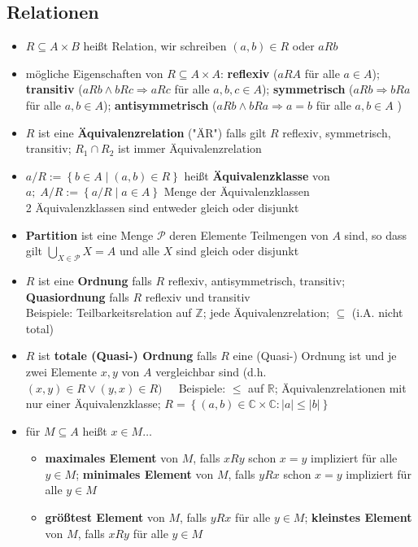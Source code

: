 \documentclass[10pt,a4paper]{article}
\begin{document}
\subsection{Relationen}
\begin{itemize}
\item $R\subseteq A\times B$ heißt Relation, wir schreiben $(a,b) \in R$ oder $aRb$
\item mögliche Eigenschaften von $R\subseteq A\times A$: \textbf{reflexiv} ($aRA$ für alle $a\in A$); \textbf{transitiv} ($aRb\land bRc \Rightarrow aRc$ für alle $a,b,c\in A$); \textbf{symmetrisch} ($aRb\Rightarrow bRa$ für alle $a,b \in A$); \textbf{antisymmetrisch} ($aRb\land bRa \Rightarrow a=b$ für alle $a,b\in A$ )
\item $R$ ist eine \textbf{Äquivalenzrelation} ("ÄR") falls gilt $R$ reflexiv, symmetrisch, transitiv; $R_{1}\cap R_{2}$ ist immer Äquivalenzrelation 
\item $a/R:=\left\lbrace b\in A\mid (a,b) \in R\right\rbrace$ heißt \textbf{Äquivalenzklasse} von $a;\; A/R:=\left\lbrace a/R\mid a\in A\right\rbrace$ Menge der Äquivalenzklassen  \\
2 Äquivalenzklassen sind entweder gleich oder disjunkt
\item \textbf{Partition} ist eine Menge $\mathcal{P}$ deren Elemente Teilmengen von $A$ sind, so dass gilt $\bigcup_{X\in \mathcal{P}} X=A$ und alle $X$ sind gleich oder disjunkt


\item $R$ ist eine \textbf{Ordnung} falls $R$ reflexiv, antisymmetrisch, transitiv; \textbf{Quasiordnung} falls $R$ reflexiv und transitiv\\
Beispiele: Teilbarkeitsrelation auf $\mathbb{Z}$; jede Äquivalenzrelation; $\subseteq$ (i.A. nicht total)
\item $R$ ist \textbf{totale (Quasi-) Ordnung} falls $R$ eine (Quasi-) Ordnung ist und je zwei Elemente $x,y$ von $A$ vergleichbar sind (d.h. $(x,y)\in R\lor (y,x)\in R)\;\;\;\;$ Beispiele: $\leq$ auf $\mathbb{R}$; Äquivalenzrelationen mit nur einer Äquivalenzklasse; $R=\left\lbrace (a,b) \in \mathbb{C}\times \mathbb{C}: \vert a\vert \leq \vert b \vert \right\rbrace$ 
\item für $M\subseteq A$ heißt $x\in M\dotsc$ 

\begin{itemize}
\item \textbf{maximales Element} von $M$, falls $xRy$ schon $x=y$ impliziert für alle $y\in M$; \textbf{minimales Element} von $M$, falls $yRx$ schon $x=y$ impliziert für alle $y\in M$
\item \textbf{größtest Element} von $M$, falls $yRx$ für alle $y\in M$; \textbf{kleinstes Element} von $M$, falls $xRy$ für alle $y\in M$ 
\end{itemize}


\end{itemize}
\end{document}
